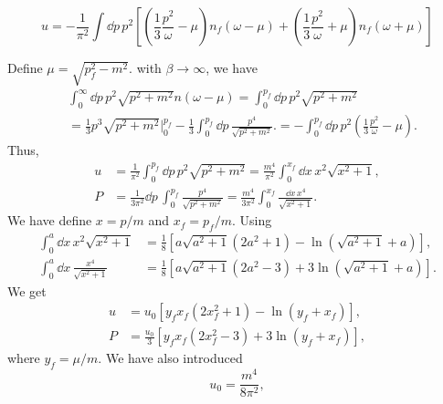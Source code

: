 %
\begin{equation}
    u
    =
    -\frac{1}{\pi^2}
    \int \dd p \,
    p^2
    \left[
        \left(
            \frac{1}{3}
            \frac{p^2}{\omega}
            -
            \mu
        \right)
        n_f(\omega - \mu)
        +
        \left(
            \frac{1}{3}
            \frac{p^2}{\omega}
            +
            \mu
        \right)
        n_f(\omega + \mu)
    \right]
\end{equation}
%

Define $\mu = \sqrt{p_f^2 - m^2}$.
with $\beta \rightarrow \infty$, we have
%
\begin{align}
    &\int_0^\infty \dd p \, p^2  \sqrt{p^2 + m^2} n(\omega - \mu)
    =
    \int_0^{p_f} \dd p \, p^2 \sqrt{p^2 + m^2}\\
    & = \frac{1}{3} p^3 \sqrt{p^2 + m^2 }\bigg|_0^{p_f} 
    - \frac{1}{3}\int_0^{p_f} \dd p \, \frac{p^4}{\sqrt{p^2 + m^2}}.
    =
    -
    \int_0^{p_f}
    \dd p \, p^2
    \left(
        \frac{1}{3}
        \frac{p^2}{\omega}
        - \mu
    \right).
\end{align}
%
Thus,
%
\begin{align}
    u &= \frac{1}{\pi^2} \int_0^{p_f} \dd p \,
    p^2 \sqrt{p^2 + m^2}
    = \frac{m^4}{\pi^2} \int_0^{x_f} \dd x \, x^2 \sqrt{x^2 + 1}, \\
    P & = \frac{1}{3 \pi^2} \dd p \, \int_0^{p_f}\frac{p^4}{\sqrt{p^2 + m^2}} 
    = \frac{m^4}{3 \pi^2} \int_0^{x_f} \frac{\dd x \, x^4}{\sqrt{x^2 + 1}}.
\end{align}
% 
We have define $x = p / m$ and $x_f = p_f/m$.
Using 
%
\begin{align}
    \int_0^a \dd x \, x^2 \sqrt{x^2 + 1} 
    & = \frac{1}{8} 
    \left[a \sqrt{a^2 + 1}(2 a^2 + 1) - \ln\left(\sqrt{a^2 + 1} + a\right)\right], \\
    \int_0^a \dd x \, \frac{x^4}{\sqrt{x^2 + 1} }
    & = \frac{1}{8} 
    \left[a \sqrt{a^2 + 1}(2 a^2 - 3) + 3\ln\left(\sqrt{a^2 + 1} + a\right)\right].
\end{align}
%
We get 
%
\begin{align}
    u &= u_0
    \left[y_f x_f (2x_f^2 + 1) - \ln\left(y_f + x_f\right)\right], \\
    P &= \frac{u_0}{3}
    \left[y_f x_f (2x_f^2 -3) + 3\ln\left(y_f + x_f\right)\right],
\end{align}
%
where $y_f = \mu / m$.
We have also introduced
%
\begin{equation}
    u_0 = \frac{m^4}{8 \pi^2},
\end{equation}
